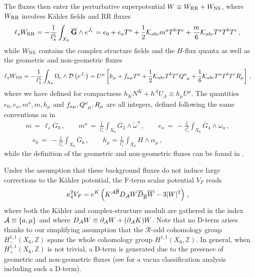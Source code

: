 \documentclass[11pt, a4paper]{article}
\newcommand{\K}{{\cal K}}
\newcommand{\A}{{\cal A}}
\newcommand{\B}{{\cal B}}
\newcommand{\Z}{\mathbb{Z}}
\def\ov{\overline}
\newcommand{\half}{\frac{1}{2}}
\begin{document}
The fluxes then enter the perturbative superpotential $W\equiv W_{\rm RR} + W_{\rm NS}$, where $W_{\rm RR}$ involves K\"ahler fields and RR fluxes \cite{Taylor:1999ii}
\begin{equation} \label{WRR}
\ell_s W_{\rm RR} = - \frac{1}{\ell_s^5} \int_{X_6} {\ov{\bf G}} \wedge e^{J_c}= e_0 + e_a T^a + \frac{1}{2} {\cal K}_{abc} m^a T^b T^c + \frac{m}{6} {\cal K}_{abc} T^a T^b T^c\,,
\end{equation}
%
while $W_{\rm NS}$ contains the complex structure fields and the $H$-flux quanta as well as the geometric and non-geometric fluxes
\begin{equation} \label{WNS}
\ell_s W_{\rm NS} = -\frac{1}{\ell_s^5} \int_{X_6}\Omega_c\wedge \mathcal{D}\left(e^{J_{\rm c}}\right) = U^\mu\left[h_\mu+f_{a\mu}T^a+\half\K_{abc}T^bT^c\tensor{Q}{^a_\mu}+\frac{1}{6}\K_{abc}T^aT^bT^cR_\mu\right]\, ,
\end{equation}
%
where we have defined for compactness $h_K N^K  + h^\Lambda U_{\Lambda} \equiv h_\mu U^\mu$. The quantities $e_0, e_a, m^a, m, h_\mu$ and  $f_{a\mu}, \tensor{Q}{^a_\mu}, R_\mu$ are all integers, defined following the same conventions as in \cite{Marchesano:2021ycx}
\begin{equation}
\begin{gathered}
m \, = \,  \ell_s G_0\, ,  \qquad  m^a\, =\, \frac{1}{\ell_s^5} \int_{X_6} \ov{G}_2 \wedge \tilde \omega^a\, , \qquad  e_a\, =\, - \frac{1}{\ell_s^5} \int_{X_6} \ov{G}_4 \wedge \omega_a \, ,\\
\quad e_0 \, =\, - \frac{1}{\ell_s^5} \int_{X_6} \ov{G}_6 \,,\qquad 
h_\mu=\frac{1}{\ell_s^5}\int_{X_6} H\wedge \alpha_\mu\, ,
\end{gathered}
\label{RRfluxes}
\end{equation}
%
while the definition of the geometric and non-geometric fluxes can be found in \cite{Marchesano:2020uqz}.

Under the assumption that these background fluxes do not induce large corrections to the Kähler potential, the F-term scalar potential $V_F$ reads
\begin{equation}
\kappa_4^2V_F=e^K\left(K^{\A\ov \B}D_\A W\ov D_{\ov\B}\ov W-3|W|^2\right)\, ,
\end{equation}
%
where both the Kähler and complex-structure moduli are gathered in the index $\A\equiv\{a,\mu\}$ and where $D_\A W\equiv\partial_\A W+(\partial_\A K)W$. Note that no D-term arises thanks to our simplifying assumption that the $\mathcal{R}$-odd cohomology group $H^{1,1}_-(X_6,\Z)$ spans the whole cohomology group $H^{1,1}(X_6,\Z)$. In general, when $H^{1,1}_+(X_6,\Z)$ is not trivial, a D-term is generated due to the presence of geometric and non-geometric fluxes \cite{Ihl:2007ah,Robbins:2007yv} (see \cite{Marchesano:2020uqz} for a vacua classification analysis including such a D-term).
\end{document}
